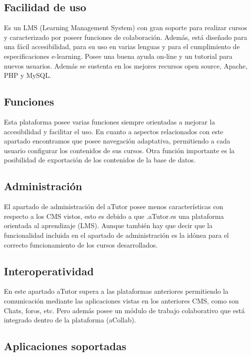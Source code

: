 \subsection{Facilidad de uso}

Es un LMS (Learning Management System) con gran soporte para realizar cursos y caracterizado por poseer funciones de colaboración. Además, está diseñado para una fácil accesibilidad, para su uso en varias lenguas y para el cumplimiento de especificaciones e-learning. Posee una buena ayuda on-line y un tutorial para nuevos usuarios. Además se sustenta en los mejores recursos open source, Apache, PHP y MySQL.

\subsection{Funciones}

Esta plataforma posee varias funciones siempre orientadas a mejorar la accesibilidad y facilitar el uso. En cuanto a aspectos relacionados con este apartado encontramos que posee navegación adaptativa, permitiendo a cada usuario configurar los contenidos de sus cursos. Otra función importante es la posibilidad de exportación de los contenidos de la base de datos.

\subsection{Administración}

El apartado de administración del aTutor posee menos características con respecto a los CMS vistos, esto es debido a que .aTutor.es una plataforma orientada al aprendizaje (LMS). Aunque también hay que decir que la funcionalidad incluida en el apartado de administración es la idónea para el correcto funcionamiento de los cursos desarrollados.

\subsection{Interoperatividad}

En este apartado aTutor supera a las plataformas anteriores permitiendo la comunicación mediante las aplicaciones vistas en los anteriores CMS, como son Chats, foros, etc. Pero además posee un módulo de trabajo colaborativo que está integrado dentro de la plataforma (aCollab).

\subsection{Aplicaciones soportadas}

